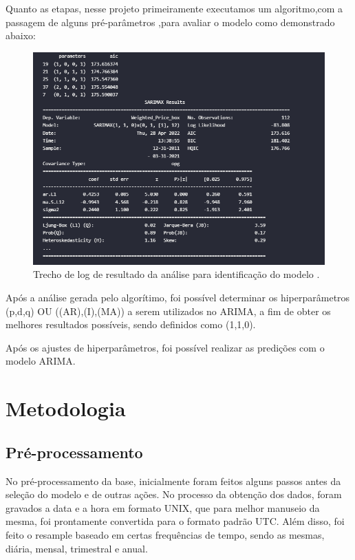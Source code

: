 \documentclass[sigplan,screen]{acmart}
\begin{document}
Quanto as etapas, nesse projeto primeiramente executamos um algoritmo,com a passagem de alguns pré-parâmetros
,para avaliar o modelo como demonstrado abaixo:


\begin{figure}[h]
  \centering
  \includegraphics[width=\linewidth]{ibagens/ARIMAcompleStatistics.png}
  \caption{Trecho de log de resultado da análise para identificação do modelo .}
\end{figure}

Após a análise gerada pelo algorítimo, foi possível determinar os hiperparâmetros (p,d,q) OU ((AR),(I),(MA)) a serem utilizados no ARIMA, a fim de obter os melhores resultados possíveis, sendo definidos como (1,1,0).

Após os ajustes de hiperparâmetros, foi possível realizar as predições com o modelo ARIMA.




\section{Metodologia}
\subsection{Pré-processamento}
No pré-processamento da base, inicialmente foram feitos alguns passos antes da seleção do modelo e de outras ações.
No processo da obtenção dos dados, foram gravados a data e a hora em formato UNIX, que para melhor manuseio da mesma, foi prontamente convertida para o formato padrão UTC.
Além disso, foi feito o resample baseado em certas frequências de tempo, sendo as mesmas, diária, mensal, trimestral e anual.
\end{document}
